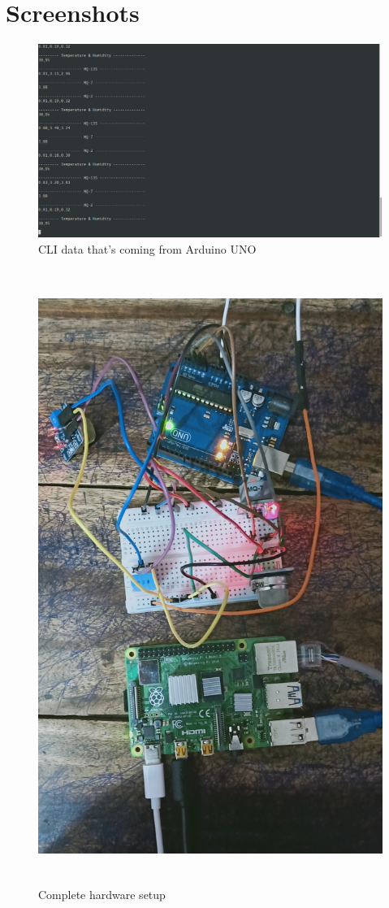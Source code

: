 \chapter{Screenshots}\label{appendix1}


\begin{figure}[!ht]
\centering
\includegraphics[width=\linewidth]{figures/clt-data.png}
\caption{\label{imgA2} CLI data that's coming from Arduino UNO}
\end{figure}

\begin{figure}[!ht]
\centering
\includegraphics[width=\linewidth,height = 20cm]{figures/hardware.jpg}
\caption{\label{imgA1} Complete hardware setup}
\end{figure}

